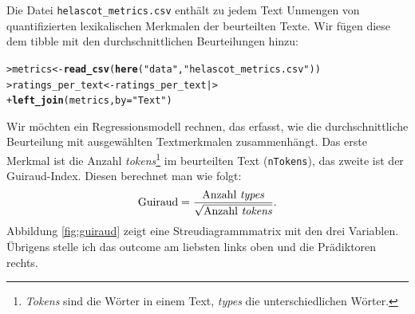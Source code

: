 \documentclass[oneside, 10pt]{book}\usepackage[]{graphicx}\usepackage[]{xcolor}
\makeatletter
\newcommand{\hlstr}[1]{\textcolor[rgb]{0.192,0.494,0.8}{#1}}%
\newcommand{\hlstd}[1]{\textcolor[rgb]{0.345,0.345,0.345}{#1}}%
\newcommand{\hlkwb}[1]{\textcolor[rgb]{0.69,0.353,0.396}{#1}}%
\newcommand{\hlkwc}[1]{\textcolor[rgb]{0.333,0.667,0.333}{#1}}%
\newcommand{\hlkwd}[1]{\textcolor[rgb]{0.737,0.353,0.396}{\textbf{#1}}}%
\newenvironment{kframe}{%
 \def\at@end@of@kframe{}%
 \ifinner\ifhmode%
  \def\at@end@of@kframe{\end{minipage}}%
  \begin{minipage}{\columnwidth}%
 \fi\fi%
 \def\FrameCommand##1{\hskip\@totalleftmargin \hskip-\fboxsep
 \colorbox{shadecolor}{##1}\hskip-\fboxsep
     \hskip-\linewidth \hskip-\@totalleftmargin \hskip\columnwidth}%
 \MakeFramed {\advance\hsize-\width
   \@totalleftmargin\z@ \linewidth\hsize
   \@setminipage}}%
 {\par\unskip\endMakeFramed%
 \at@end@of@kframe}
\newenvironment{knitrout}{}{} %
\makeatother
\begin{document}
Die Datei \texttt{helascot\_metrics.csv} enthält zu jedem Text
Unmengen von quantifizierten lexikalischen Merkmalen der beurteilten Texte.
Wir fügen diese dem tibble mit den durchschnittlichen Beurteilungen hinzu:
\begin{knitrout}
\color{fgcolor}\begin{kframe}
\begin{alltt}
\hlstd{> }\hlstd{metrics} \hlkwb{<-} \hlkwd{read_csv}\hlstd{(}\hlkwd{here}\hlstd{(}\hlstr{"data"}\hlstd{,} \hlstr{"helascot_metrics.csv"}\hlstd{))}
\hlstd{> }\hlstd{ratings_per_text} \hlkwb{<-} \hlstd{ratings_per_text |>}
\hlstd{+ }  \hlkwd{left_join}\hlstd{(metrics,} \hlkwc{by} \hlstd{=} \hlstr{"Text"}\hlstd{)}
\end{alltt}
\end{kframe}
\end{knitrout}
Wir möchten ein Regressionsmodell rechnen, das erfasst, wie die durchschnittliche
Beurteilung mit ausgewählten Textmerkmalen zusammenhängt. Das erste Merkmal
ist die Anzahl \textit{tokens}\footnote{\textit{Tokens} sind die Wörter in einem Text,
\textit{types} die unterschiedlichen Wörter.} im beurteilten Text (\texttt{nTokens}), das zweite
ist der Guiraud-Index. Diesen berechnet man wie folgt:
\[
  \textrm{Guiraud} = \frac{\textrm{Anzahl \textit{types}}}{\sqrt{\textrm{Anzahl \textit{tokens}}}}.
\]
Abbildung \ref{fig:guiraud} zeigt eine Streudiagrammmatrix mit den drei Variablen.
Übrigens stelle ich das outcome am liebsten links oben und die Prädiktoren rechts.
\end{document}
